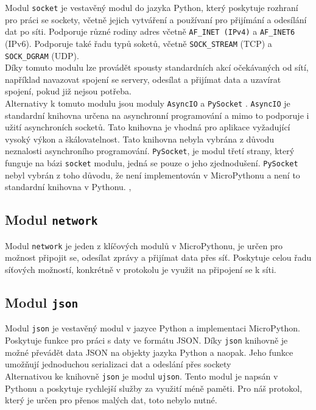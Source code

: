 \documentclass[12pt]{report}			%
\begin{document}
Modul \texttt{socket} je vestavěný modul do jazyka Python, který poskytuje rozhraní pro práci se sockety, včetně jejich vytváření a používaní pro přijímání a odesílání dat po síti. Podporuje různé rodiny adres včetně \texttt{AF\_INET (IPv4)} a \texttt{AF\_INET6} (IPv6). Podporuje také řadu typů soketů, včetně \texttt{SOCK\_STREAM} (TCP) a \texttt{SOCK\_DGRAM} (UDP). \cite{socket}
\\
Díky tomuto modulu lze provádět spousty standardních akcí očekávaných od sítí, například navazovat spojení se servery, odesílat a přijímat data a uzavírat spojení, pokud již nejsou potřeba. 
\\
Alternativy k tomuto modulu jsou moduly 
\texttt{AsyncIO} a 
\texttt{PySocket}
. \texttt{AsyncIO} je standardní knihovna určena na asynchronní programování a mimo to podporuje i užití asynchroních socketů. Tato knihovna je vhodná pro aplikace vyžadující vysoký výkon a škálovatelnost. Tato knihovna nebyla vybrána z důvodu neznalosti asynchroního programování. \texttt{PySocket}, je modul třetí strany, který funguje na bázi \texttt{socket} modulu, jedná se pouze o jeho zjednodušení. \texttt{PySocket} nebyl vybrán z toho důvodu, že není implementován v MicroPythonu a není to standardní knihovna v Pythonu. \cite{async}, \cite{pysocket}

\subsection{Modul \texttt{network}}

Modul \texttt{network} je jeden z klíčových modulů v MicroPythonu, je určen pro možnost připojit se, odesílat zprávy a přijímat data přes síť. Poskytuje celou řadu síťových možností, konkrétně v protokolu je využit na připojení se k síti. \cite{network}

\subsection{Modul \texttt{json}}
Modul \texttt{json} je vestavěný modul v jazyce Python a  implementaci MicroPython. Poskytuje funkce pro práci s daty ve formátu JSON. Díky \texttt{json} knihovně je možné převádět data JSON na objekty jazyka Python a naopak. Jeho funkce umožňují jednoduchou serializaci dat a odeslání přes sockety \cite{json}
\\
Alternativou ke knihovně \texttt{json} je modul \texttt{ujson}. Tento modul je napsán v Pythonu a poskytuje rychlejší služby za využití méně paměti. Pro náš protokol, který je určen pro přenos malých dat, toto nebylo nutné. \cite{ujson}
\end{document}
